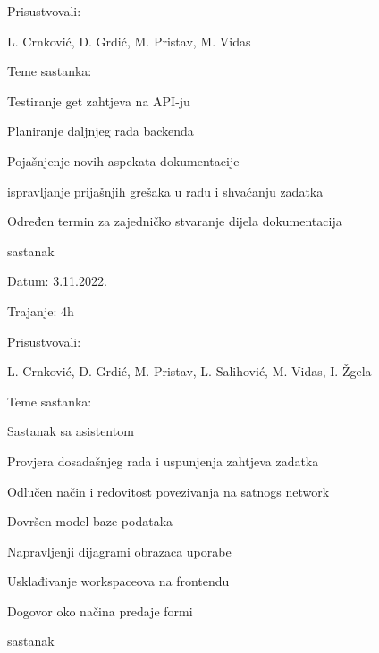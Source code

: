 \begin{packed_enum}
\begin{packed_item}
	
	\item Prisustvovali: \begin{packed_enum}
		
		\item[]  L. Crnković,
		D. Grdić,
		M. Pristav,
		M. Vidas
	\end{packed_enum}
	\item Teme sastanka:
	\begin{packed_item}
		\item  Testiranje get zahtjeva na API-ju
		\item  Planiranje daljnjeg rada backenda
		\item  Pojašnjenje novih aspekata dokumentacije
		\item  ispravljanje prijašnjih grešaka u radu i shvaćanju zadatka
		\item  Određen termin za zajedničko stvaranje dijela dokumentacija
	\end{packed_item}
\end{packed_item}

\item  sastanak

\item[] \begin{packed_item}
	\item Datum: 3.11.2022.
	\item Trajanje: 4h
	
	
	\item Prisustvovali: \begin{packed_enum}
		
		\item[]  
		L. Crnković,
		D. Grdić,
		M. Pristav,
		L. Salihović,
		M. Vidas,
		I. Žgela
	\end{packed_enum}
	\item Teme sastanka:
	\begin{packed_item}
		\item  Sastanak sa asistentom
		\item Provjera dosadašnjeg rada i uspunjenja zahtjeva zadatka
		\item Odlučen način i redovitost povezivanja na satnogs network
		\item Dovršen model baze podataka
		\item Napravljenji  dijagrami obrazaca uporabe
		\item Usklađivanje workspaceova na frontendu
		\item Dogovor oko načina predaje formi
	\end{packed_item}
\end{packed_item}
	\item  sastanak


\end{packed_enum}
